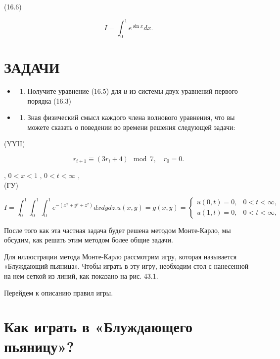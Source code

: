 \documentclass[
  ukrainian,
]{article}
\providecommand{\tightlist}{%
  \setlength{\itemsep}{0pt}\setlength{\parskip}{0pt}}
\begin{document}
(16.6)

\[
I = \int_{0}^{1} e^{\sin x} dx.
\]

\section{ЗАДАЧИ}\label{ux437ux430ux434ux430ux447ux438-2}

\begin{itemize}
\tightlist
\item
  \begin{enumerate}
  \def\labelenumi{\arabic{enumi}.}
  \tightlist
  \item
    Получите уравнение (16.5) для \emph{и} из системы двух уравнений
    первого порядка (16.3)
  \end{enumerate}
\item
  \begin{enumerate}
  \def\labelenumi{\arabic{enumi}.}
  \setcounter{enumi}{1}
  \tightlist
  \item
    Зная физический смысл каждого члена волнового уравнения, что вы
    можете сказать о поведении во времени решения следующей задачи:
  \end{enumerate}
\end{itemize}

(YYII)

\[
r_{i+1} \equiv (3r_i + 4) \mod 7, \quad r_0 = 0.
\]

, \(0 < x < 1\) , \(0 < t < \infty\) ,\\
(ГУ)

\[
I = \int_{0}^{1} \int_{0}^{1} \int_{0}^{1} e^{-(x^{2}+y^{2}+z^{2})} dx dy dz.
u(x,y) = g(x,y) =
\begin{cases} u(0, t) = 0, & 0 < t < \infty, \\ u(1, t) = 0, & 0 < t < \infty, \end{cases}
\]

После того как эта частная задача будет решена методом Монте-Карло, мы
обсудим, как решать этим методом более общие задачи.

Для иллюстрации метода Монте-Карло рассмотрим игру, которая называется
«Блуждающий пьяница». Чтобы играть в эту игру, необходим стол с
нанесенной на нем сеткой из линий, как показано на рис. 43.1.

Перейдем к описанию правил игры.

\section{Как играть в «Блуждающего
пьяницу»?}\label{ux43aux430ux43a-ux438ux433ux440ux430ux442ux44c-ux432-ux431ux43bux443ux436ux434ux430ux44eux449ux435ux433ux43e-ux43fux44cux44fux43dux438ux446ux443}
\end{document}
